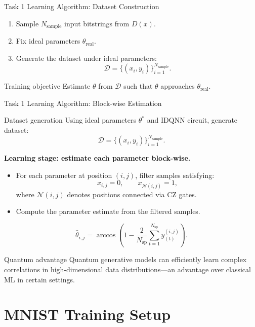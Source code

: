 \documentclass[aspectratio=169]{beamer}
\begin{document}
\begin{frame}{Task 1 Learning Algorithm: Dataset Construction}
  \begin{enumerate}
    \item Sample $N_{\mathrm{sample}}$ input bitstrings from $D(x)$.
    \item Fix ideal parameters $\theta_{\mathrm{real}}$.
    \item Generate the dataset under ideal parameters:
    \[
      \mathcal D = \{(x_i,y_i)\}_{i=1}^{N_{\mathrm{sample}}}.
    \]
  \end{enumerate}

  \vspace{0.25em}
  \begin{block}{Training objective}
    Estimate $\theta$ from $\mathcal D$ such that $\theta$ approaches $\theta_{\mathrm{real}}$.
  \end{block}
\end{frame}

\begin{frame}{Task 1 Learning Algorithm: Block-wise Estimation}
  \small
  \begin{block}{Dataset generation}
    Using ideal parameters $\theta^*$ and IDQNN circuit, generate dataset:
    \[
      \mathcal{D} = \{(x_i, y_i)\}_{i=1}^{N_{\mathrm{sample}}}.
    \]
  \end{block}

  {\bfseries Learning stage: estimate each parameter block-wise.}
  \begin{itemize}
    \item For each parameter at position $(i,j)$, filter samples satisfying:
    \[
      x_{i,j}=0,\qquad x_{\mathcal N(i,j)}=1,
    \]
    where $\mathcal N(i,j)$ denotes positions connected via CZ gates.
    \item Compute the parameter estimate from the filtered samples.
  \end{itemize}

  \[
    \hat\theta_{i,j}=\arccos\!\left(1-\frac{2}{N_{\mathrm{sp}}}\sum_{t=1}^{N_{\mathrm{sp}}}y^{(i,j)}_{(t)}\right).
  \]

  \begin{alertblock}{Quantum advantage}
    Quantum generative models can efficiently learn complex correlations in high-dimensional data distributions—an advantage over classical ML in certain settings.
  \end{alertblock}
\end{frame}

\section{MNIST Training Setup}
\end{document}
